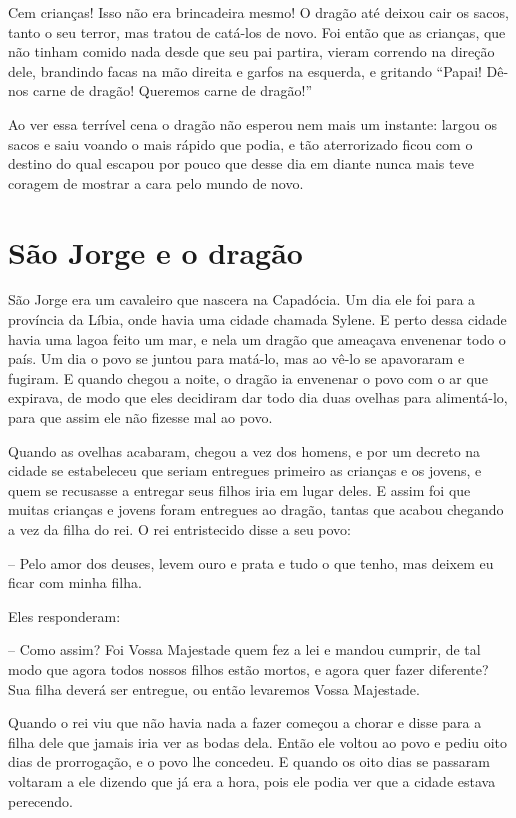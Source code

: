 Cem crianças! Isso não era brincadeira mesmo! O dragão até deixou cair
os sacos, tanto o seu terror, mas tratou de catá-los de novo. Foi
então que as crianças, que não tinham comido nada desde que seu pai
partira, vieram correndo na direção dele, brandindo facas na mão
direita e garfos na esquerda, e gritando “Papai! Dê-nos carne de
dragão! Queremos carne de dragão!”

Ao ver essa terrível cena o dragão não esperou nem mais um instante:
largou os sacos e saiu voando o mais rápido que podia, e tão
aterrorizado ficou com o destino do qual escapou por pouco que desse
dia em diante nunca mais teve coragem de mostrar a cara pelo mundo de
novo.

\chapter{São Jorge e o dragão}

São Jorge era um cavaleiro que nascera na Capadócia. Um dia ele foi
para a província da Líbia, onde havia uma cidade chamada Sylene. E
perto dessa cidade havia uma lagoa feito um mar, e nela um dragão que
ameaçava envenenar todo o país. Um dia o povo se juntou para matá-lo,
mas ao vê-lo se apavoraram e fugiram. E quando chegou a noite, o
dragão ia envenenar o povo com o ar que expirava, de modo que eles
decidiram dar todo dia duas ovelhas para alimentá-lo, para que assim
ele não fizesse mal ao povo. 

Quando as ovelhas acabaram, chegou a vez dos homens, e por um decreto
na cidade se estabeleceu que seriam entregues primeiro as crianças e
os jovens, e quem se recusasse a entregar seus filhos iria em lugar
deles. E assim foi que muitas crianças e jovens foram entregues ao
dragão, tantas que acabou chegando a vez da filha do rei. O rei
entristecido disse a seu povo:

-- Pelo amor dos deuses, levem ouro e prata e tudo o que tenho, mas
deixem eu ficar com minha filha. 

Eles responderam:

-- Como assim? Foi Vossa Majestade quem fez a lei e mandou cumprir, de
tal modo que agora todos nossos filhos estão mortos, e agora quer
fazer diferente? Sua filha deverá ser entregue, ou então levaremos
Vossa Majestade. 

Quando o rei viu que não havia nada a fazer começou a chorar e disse
para a filha dele que jamais iria ver as bodas dela. Então ele voltou
ao povo e pediu oito dias de prorrogação, e o povo lhe concedeu. E
quando os oito dias se passaram voltaram a ele dizendo que já era a
hora, pois ele podia ver que a cidade estava perecendo.

